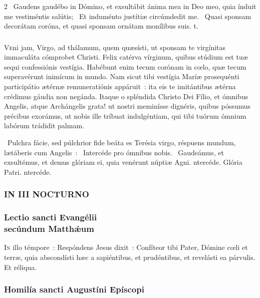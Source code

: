 \documentclass[9pt,twoside]{extarticle}
\begin{document}
\begin{multicols}{2}
~Gaudens gaudébo in Dómino, et exsultábit ánima mea in Deo meo, quia índuit me vestiméntis salútis; \textred{*}~Et induménto justítiæ circúmdedit me. ~Quasi sponsam decorátam coróna, et quasi sponsam ornátam monílibus suis. t.

\subsubsection*{\center \normalfont {}}
\lettrine{V}eni jam, Virgo, ad thálamum, quem quæsísti, ut sponsam te virgínitas immaculáta cómprobet Christi. Felix catérva vírginum, quibus stúdium est tuæ sequi confessiónis vestígia. Habébunt enim tecum corónam in cœlo, quæ tecum superavérunt inimícum in mundo. Nam sicut tibi vestígia Maríæ prosequénti participátio ætérnæ remuneratiónis appáruit~: ita eis te imitántibus ætérna crédimus gáudia non negánda. Itaque o spléndida Christo Dei Fílio, et ómnibus Angelis, atque Archángelis grata! ut nostri meminísse dignéris, quibus póssumus précibus exorámus, ut nobis ille tríbuat indulgéntiam, qui tibi tuórum ómnium labórum trádidit palmam. 

~Pulchra fácie, sed púlchrior fide beáta es Terésia virgo, réspuens mundum, lætáberis cum Angelis~: \textred{*}~Intercéde pro ómnibus nobis. ~Gaudeámus, et exsultémus, et demus glóriam ei, quia venérunt núptiæ Agni. ntercéde. Glória Patri. ntercéde.

\subsubsection*{\center \normalfont \small \textsc{IN III NOCTURNO}}
\subsubsection*{\center \normalfont Lectio sancti Evangélii\\ secúndum Matthǽum\\
}
\lettrine{I}n illo témpore~: Respóndens Jesus dixit~: Confíteor tibi Pater, Dómine cœli et terræ, quia abscondísti hæc a sapiéntibus, et prudéntibus, et revelásti ea párvulis. Et réliqua.

\subsubsection*{\center \normalfont Homilía sancti Augustíni Epíscopi\\
\small {}}


\end{multicols}
\end{document}
